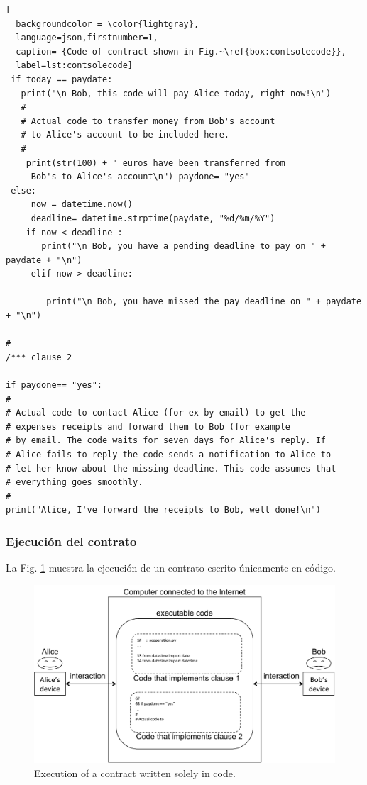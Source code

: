 \documentclass[12pt]{report} %
\begin{document}
\begin{lstlisting}[
  backgroundcolor = \color{lightgray},
  language=json,firstnumber=1,
  caption= {Code of contract shown in Fig.~\ref{box:contsolecode}},
  label=lst:contsolecode]
 if today == paydate:
   print("\n Bob, this code will pay Alice today, right now!\n")
   #
   # Actual code to transfer money from Bob's account
   # to Alice's account to be included here.
   #
    print(str(100) + " euros have been transferred from 
     Bob's to Alice's account\n") paydone= "yes"
 else:
     now = datetime.now()
     deadline= datetime.strptime(paydate, "%d/%m/%Y")
    if now < deadline :
       print("\n Bob, you have a pending deadline to pay on " + paydate + "\n")
     elif now > deadline:

        print("\n Bob, you have missed the pay deadline on " + paydate + "\n")
        
#
/*** clause 2
 
if paydone== "yes":
#
# Actual code to contact Alice (for ex by email) to get the
# expenses receipts and forward them to Bob (for example
# by email. The code waits for seven days for Alice's reply. If
# Alice fails to reply the code sends a notification to Alice to
# let her know about the missing deadline. This code assumes that
# everything goes smoothly.
#
print("Alice, I've forward the receipts to Bob, well done!\n")
\end{lstlisting}



\subsubsection{Ejecución del contrato}

La Fig. \ref{fig:execontsolecode}  muestra la ejecución de un contrato escrito únicamente en código.

\begin{figure}
\centering
\includegraphics[width=0.98\columnwidth]{figures/execontsolecode.pdf}
\caption{Execution of a contract written solely in code.}
\label{fig:execontsolecode}
\end{figure}
 
\end{document}
